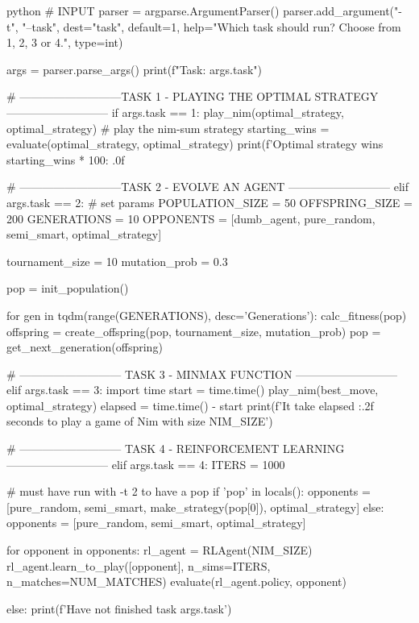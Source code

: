 \begin{mintedbox}{python}
    # INPUT
    parser = argparse.ArgumentParser()
    parser.add_argument("-t", "--task", dest="task", default=1,
                        help="Which task should run? Choose from 1, 2, 3 or 4.", type=int)

    args = parser.parse_args()
    print(f"Task: {args.task}")

    # ---------------------------TASK 1 - PLAYING THE OPTIMAL STRATEGY ---------------------------
    if args.task == 1:
        play_nim(optimal_strategy, optimal_strategy)
        # play the nim-sum strategy
        starting_wins = evaluate(optimal_strategy, optimal_strategy)
        print(f'Optimal strategy wins {starting_wins * 100: .0f}%

    # ---------------------------TASK 2 - EVOLVE AN AGENT ---------------------------
    elif args.task == 2:
        # set params
        POPULATION_SIZE = 50
        OFFSPRING_SIZE = 200
        GENERATIONS = 10
        OPPONENTS = [dumb_agent, pure_random, semi_smart, optimal_strategy]

        tournament_size = 10
        mutation_prob = 0.3

        pop = init_population()

        for gen in tqdm(range(GENERATIONS), desc='Generations'):
            calc_fitness(pop)
            offspring = create_offspring(pop, tournament_size, mutation_prob)
            pop = get_next_generation(offspring)

    # --------------------------- TASK 3 - MINMAX FUNCTION ---------------------------
    elif args.task == 3:
        import time
        start = time.time()
        play_nim(best_move, optimal_strategy)
        elapsed = time.time() - start
        print(f'It take {elapsed :.2f} seconds to play a game of Nim with size {NIM_SIZE}')

    # --------------------------- TASK 4 - REINFORCEMENT LEARNING ---------------------------
    elif args.task == 4:
        ITERS = 1000

        # must have run with -t 2 to have a pop
        if 'pop' in locals():
            opponents = [pure_random, semi_smart, make_strategy(pop[0]), optimal_strategy]
        else:
            opponents = [pure_random, semi_smart, optimal_strategy]

        for opponent in opponents:
            rl_agent = RLAgent(NIM_SIZE)
            rl_agent.learn_to_play([opponent], n_sims=ITERS, n_matches=NUM_MATCHES)
            evaluate(rl_agent.policy, opponent)


    else:
        print(f'Have not finished task {args.task}')
\end{mintedbox}


